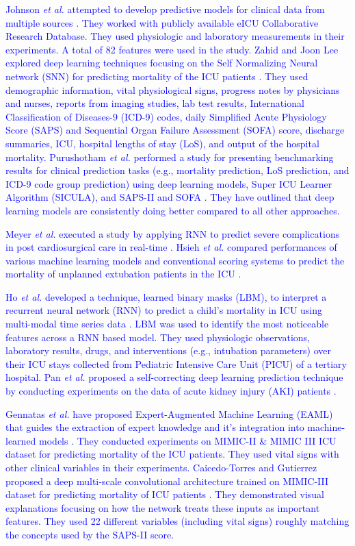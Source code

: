 \textcolor{blue}{Johnson \textit{et al.} attempted to develop predictive models for clinical data from multiple sources \cite{Johnson3rd2018}. They worked with publicly available eICU Collaborative Research Database. They used physiologic and laboratory measurements in their experiments. A total of 82 features were used in the study. Zahid and Joon Lee explored deep learning techniques focusing on the Self Normalizing Neural network (SNN) for predicting mortality of the ICU patients \cite{Zahid2018}. They used demographic information, vital physiological signs, progress notes by physicians and nurses, reports from imaging studies, lab test results, International Classification of Diseases-9 (ICD-9) codes, daily Simplified Acute Physiology Score (SAPS) and Sequential Organ Failure Assessment (SOFA) score, discharge summaries, ICU, hospital lengths of stay (LoS), and output of the hospital mortality. Purushotham \textit{et al.} performed a study for presenting benchmarking results for clinical prediction tasks (e.g., mortality prediction, LoS prediction, and ICD-9 code group prediction) using deep learning models, Super ICU Learner Algorithm (SICULA), and SAPS-II and SOFA \cite{Purushotham2018}. They have outlined that deep learning models are consistently doing better compared to all other approaches.} 

\textcolor{blue}{Meyer \textit{et al.} executed a study by applying RNN to predict severe complications in post cardiosurgical care in real-time \cite{Meyer2018}. Hsieh \textit{et al.} compared performances of various machine learning models and conventional scoring systems to predict the mortality of unplanned extubation patients in the ICU \cite{Hsieh2018}.}

\textcolor{blue}{Ho \textit{et al.} developed a technique, learned binary masks (LBM), to interpret a recurrent neural network (RNN) to predict a child's mortality in ICU using multi-modal time series data \cite{Ho2019}. LBM was used to identify the most noticeable features across a RNN based model. They used physiologic observations, laboratory results, drugs, and interventions (e.g., intubation parameters) over their ICU stays collected from Pediatric Intensive Care Unit (PICU) of a tertiary hospital. Pan \textit{et al.} proposed a self-correcting deep learning prediction technique by conducting experiments on the data of acute kidney injury (AKI) patients \cite{Pan2019}.} 

\textcolor{blue}{Gennatas \textit{et al.} have proposed Expert-Augmented Machine Learning (EAML) that guides the extraction of expert knowledge and it's integration into machine-learned models \cite{Gennatas2019}. They conducted experiments on MIMIC-II \& MIMIC III ICU dataset for predicting mortality of the ICU patients. They used vital signs with other clinical variables in their experiments. Caicedo-Torres and Gutierrez proposed a deep multi-scale convolutional architecture trained on MIMIC-III dataset for predicting mortality of ICU patients \cite{Torres2019}. They demonstrated visual explanations focusing on how the network treats these inputs as important features. They used 22 different variables (including vital signs) roughly matching the concepts used by the SAPS-II score.}

